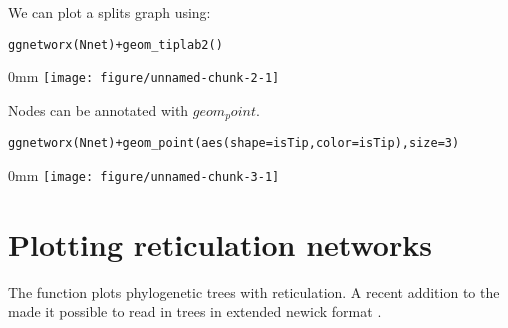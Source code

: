 \documentclass{article}\usepackage[]{graphicx}\usepackage[usenames,dvipsnames]{color}
\makeatletter
\def\maxwidth{ %
  \ifdim\Gin@nat@width>\linewidth
    \linewidth
  \else
    \Gin@nat@width
  \fi
}
\newcommand{\hlnum}[1]{\textcolor[rgb]{0.816,0.125,0.439}{#1}}%
\newcommand{\hlopt}[1]{\textcolor[rgb]{0,0,0}{#1}}%
\newcommand{\hlstd}[1]{\textcolor[rgb]{0.251,0.251,0.251}{#1}}%
\newcommand{\hlkwc}[1]{\textcolor[rgb]{0.251,0.251,0.251}{#1}}%
\newcommand{\hlkwd}[1]{\textcolor[rgb]{0.878,0.439,0.125}{#1}}%
\newenvironment{knitrout}{}{} %
\makeatother
\begin{document}
We can plot a splits graph using:
\begin{knitrout}
\color{fgcolor}\begin{kframe}
\begin{alltt}
\hlkwd{ggnetworx}\hlstd{(Nnet)} \hlopt{+} \hlkwd{geom_tiplab2}\hlstd{()}
\end{alltt}
\end{kframe}\begin{adjustwidth}{\fltoffset}{0mm}
\texttt{[image: figure/unnamed-chunk-2-1]} \end{adjustwidth}
\end{knitrout}
Nodes can be annotated with $geom_point$.
\begin{knitrout}
\color{fgcolor}\begin{kframe}
\begin{alltt}
\hlkwd{ggnetworx}\hlstd{(Nnet)} \hlopt{+} \hlkwd{geom_point}\hlstd{(}\hlkwd{aes}\hlstd{(}\hlkwc{shape}\hlstd{=isTip,} \hlkwc{color}\hlstd{=isTip),} \hlkwc{size}\hlstd{=}\hlnum{3}\hlstd{)}
\end{alltt}
\end{kframe}\begin{adjustwidth}{\fltoffset}{0mm}
\texttt{[image: figure/unnamed-chunk-3-1]} \end{adjustwidth}
\end{knitrout}


\section{Plotting reticulation networks}

The function  plots phylogenetic trees with reticulation.
A recent addition to the \cite{Paradis2018}  made it possible
to read in trees in extended newick format \cite{Cardona2008}.
\end{document}
